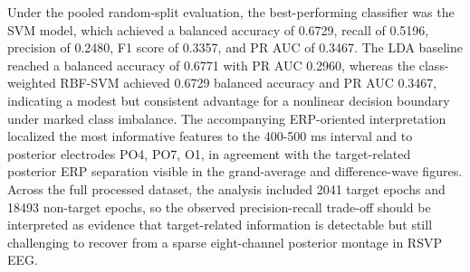 Under the pooled random-split evaluation, the best-performing classifier was the SVM model, which achieved a balanced accuracy of 0.6729, recall of 0.5196, precision of 0.2480, F1 score of 0.3357, and PR AUC of 0.3467. The LDA baseline reached a balanced accuracy of 0.6771 with PR AUC 0.2960, whereas the class-weighted RBF-SVM achieved 0.6729 balanced accuracy and PR AUC 0.3467, indicating a modest but consistent advantage for a nonlinear decision boundary under marked class imbalance. The accompanying ERP-oriented interpretation localized the most informative features to the 400-500 ms interval and to posterior electrodes PO4, PO7, O1, in agreement with the target-related posterior ERP separation visible in the grand-average and difference-wave figures. Across the full processed dataset, the analysis included 2041 target epochs and 18493 non-target epochs, so the observed precision-recall trade-off should be interpreted as evidence that target-related information is detectable but still challenging to recover from a sparse eight-channel posterior montage in RSVP EEG.

